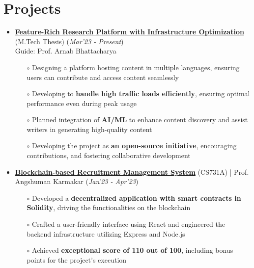 \documentclass[10.8pt, a4paper]{extarticle}
\newcommand{\shorterSection}[1]{\vspace{-10pt}\section{#1}}
\begin{document}
\shorterSection{Projects}
\vspace{-2pt}
\begin{itemize}
   
  \item \href{~} {\textbf{Feature-Rich Research Platform with Infrastructure Optimization}} (M.Tech Thesis)  \hfill\hfill(\textit{Mar'23 - Present})\\Guide: Prof. Arnab Bhattacharya
  \begin{itemize}
    \item[$\circ$] Designing a platform hosting content in multiple languages, ensuring users can contribute and access content seamlessly\\[-0.6cm]
    \item[$\circ$] Developing to \textbf{handle high traffic loads efficiently}, ensuring optimal performance even during peak usage\\[-0.6cm]
    \item[$\circ$] Planned integration of \textbf{AI/ML} to enhance content discovery and assist writers in generating high-quality content \\[-0.6cm]
    \item[$\circ$] Developing the project as \textbf{an open-source initiative}, encouraging contributions, and fostering collaborative development \\[-0.6cm]
  \end{itemize}
  \vspace{0.055cm}
  \item \href{https://github.com/vamshimorlawar/Reconchain} {\textbf{Blockchain-based Recruitment Management System}} (CS731A) | Prof. Angshuman Karmakar  \hfill\hfill(\textit{Jan'23 - Apr'23})
  \begin{itemize}
    \item[$\circ$] Developed a \textbf{decentralized application with smart contracts in Solidity}, driving the functionalities on the blockchain\\[-0.6cm]
    \item[$\circ$] Crafted a user-friendly interface using React and engineered the backend infrastructure utilizing Express and Node.js\\[-0.6cm]
    \item[$\circ$] Achieved \textbf{exceptional score of 110 out of 100}, including bonus points for the project's execution \\[-0.6cm]
  \end{itemize}

\end{itemize}
\end{document}
